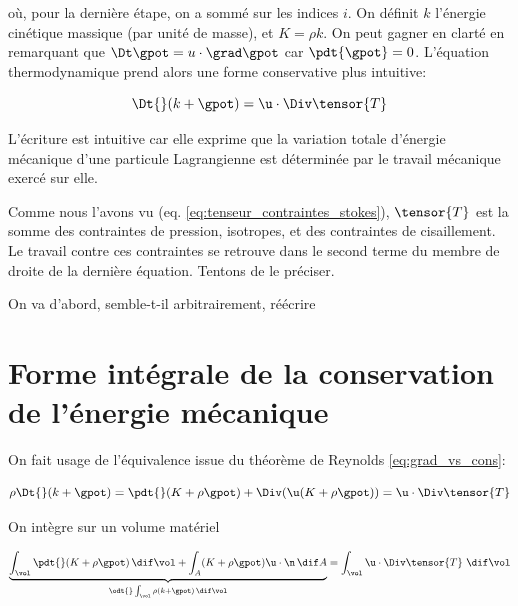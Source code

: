 où, pour la dernière étape, on a sommé sur les indices $i$. On définit $k$ l'énergie cinétique massique (par unité de masse), et $K=\rho k$. On peut gagner en clarté en remarquant que $\Dt \gpot = u\cdot\grad\gpot$ car $\pdt{\gpot}=0$. L'équation thermodynamique prend alors une forme conservative plus intuitive: 

\begin{equation}
  \Dt{}(k+\gpot) = \u \cdot\Div\tensor{T}
  \label{eq:emaca}
\end{equation}

L'écriture est intuitive car elle exprime que la variation totale d'énergie mécanique d'une particule Lagrangienne est déterminée par le travail mécanique exercé sur elle. 

Comme nous l'avons vu (eq. \ref{eq:tenseur_contraintes_stokes}), $\tensor{T}$ est la somme des contraintes de pression, isotropes, et des contraintes de cisaillement. Le travail contre ces contraintes se retrouve dans le second terme du membre de droite de la dernière équation. Tentons de le préciser. 

On va d'abord, semble-t-il arbitrairement, réécrire

%
%
%
\section{Forme intégrale de la conservation de l'énergie mécanique}

On fait usage de l'équivalence issue du théorème de Reynolds \eqref{eq:grad_vs_cons}:

\begin{displaymath}
  \rho \Dt{}(k+\gpot) = \pdt{}(K+\rho\gpot) + \Div(\u (K + \rho\gpot)) = \u\cdot\Div\tensor{T}
\end{displaymath}

On intègre sur un volume matériel

\begin{displaymath}
	\underbrace{\int_\vol \pdt{}(K+\rho\gpot)\,\dif\vol 
	+  \int_A (K+\rho\gpot)\u\cdot\n\,\dif A}_{\odt{}\int_\vol \rho(k+\gpot)\, \dif\vol}
	= 
	\int_\vol \u \cdot \Div \tensor{T}\ \dif \vol
\end{displaymath}

